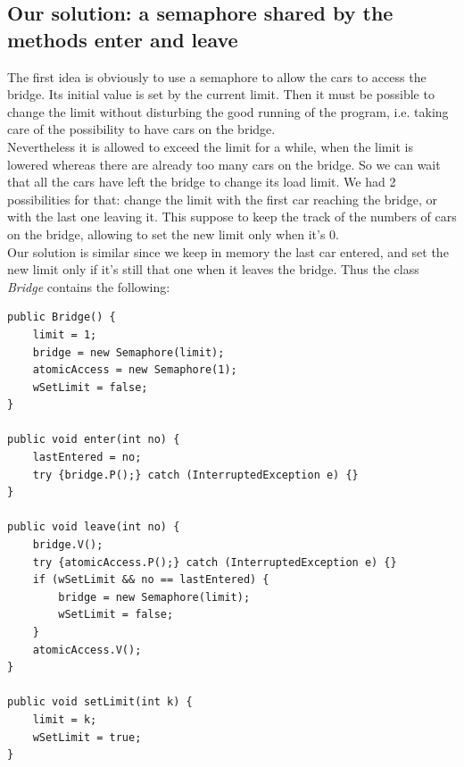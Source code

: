 \documentclass[a4paper,12pt,twoside]{article}
\begin{document}
\subsection{Our solution: a semaphore shared by the methods enter and leave}
The first idea is obviously to use a semaphore to allow the cars to access the bridge. Its initial value is set by the current limit. Then it must be possible to change the limit without disturbing the good running of the program, i.e. taking care of the possibility to have cars on the bridge.\\
Nevertheless it is allowed to exceed the limit for a while, when the limit is lowered whereas there are already too many cars on the bridge. So we can wait that all the cars have left the bridge to change its load limit. We had 2 possibilities for that: change the limit with the first car reaching the bridge, or with the last one leaving it. This suppose to keep the track of the numbers of cars on the bridge, allowing to set the new limit only when it's 0.\\
Our solution is similar since we keep in memory the last car entered, and set the new limit only if it's still that one when it leaves the bridge. Thus the class \textit{Bridge} contains the following:

\begin{verbatim}
public Bridge() {
	limit = 1;
	bridge = new Semaphore(limit);
	atomicAccess = new Semaphore(1);
	wSetLimit = false;
}

public void enter(int no) {
	lastEntered = no;
	try {bridge.P();} catch (InterruptedException e) {}
}

public void leave(int no) {
	bridge.V();
	try {atomicAccess.P();} catch (InterruptedException e) {}
	if (wSetLimit && no == lastEntered) {
		bridge = new Semaphore(limit);
		wSetLimit = false;
	}
	atomicAccess.V();
}

public void setLimit(int k) {
	limit = k;
	wSetLimit = true;
}
\end{verbatim}
\end{document}
